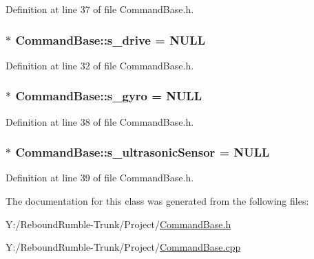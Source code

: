\-Definition at line 37 of file \-Command\-Base.\-h.

\hypertarget{class_command_base_ad3e30f2241b0fc05c2dde2f20c1110c8}{
\subsubsection[{s\-\_\-drive}]{ $\ast$ {\bf \-Command\-Base\-::s\-\_\-drive} = \-N\-U\-L\-L}}\label{class_command_base_ad3e30f2241b0fc05c2dde2f20c1110c8}


\-Definition at line 32 of file \-Command\-Base.\-h.

\hypertarget{class_command_base_ab41fbac4795141797607460fedd04181}{
\subsubsection[{s\-\_\-gyro}]{ $\ast$ {\bf \-Command\-Base\-::s\-\_\-gyro} = \-N\-U\-L\-L}}\label{class_command_base_ab41fbac4795141797607460fedd04181}


\-Definition at line 38 of file \-Command\-Base.\-h.

\hypertarget{class_command_base_a668786f77a2e65cd4f6beef52ba1538b}{
\subsubsection[{s\-\_\-ultrasonic\-Sensor}]{ $\ast$ {\bf \-Command\-Base\-::s\-\_\-ultrasonic\-Sensor} = \-N\-U\-L\-L}}\label{class_command_base_a668786f77a2e65cd4f6beef52ba1538b}


\-Definition at line 39 of file \-Command\-Base.\-h.



\-The documentation for this class was generated from the following files\-:\begin{DoxyCompactItemize}
\item 
\-Y\-:/\-Rebound\-Rumble-\/\-Trunk/\-Project/\hyperlink{_command_base_8h}{\-Command\-Base.\-h}\item 
\-Y\-:/\-Rebound\-Rumble-\/\-Trunk/\-Project/\hyperlink{_command_base_8cpp}{\-Command\-Base.\-cpp}\end{DoxyCompactItemize}
